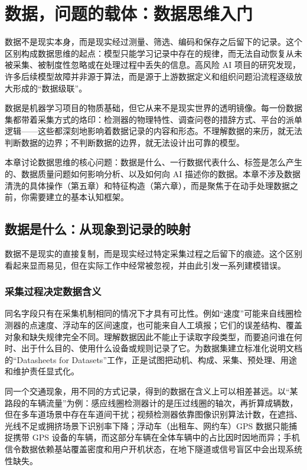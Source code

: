 ﻿\chapter{数据，问题的载体：数据思维入门}

数据不是现实本身，而是现实经过测量、筛选、编码和保存之后留下的记录。这个区别构成数据思维的起点：模型只能学习记录中存在的规律，而无法自动恢复从未被采集、被制度性忽略或在处理过程中丢失的信息。高风险 AI 项目的研究发现，许多后续模型故障并非源于算法，而是源于上游数据定义和组织问题沿流程逐级放大形成的“数据级联”\cite{sambasivan2021data}。

数据是机器学习项目的物质基础，但它从来不是现实世界的透明镜像。每一份数据集都带着采集方式的烙印：检测器的物理特性、调查问卷的措辞方式、平台的派单逻辑——这些都深刻地影响着数据记录的内容和形态。不理解数据的来历，就无法判断数据的边界；不判断数据的边界，就无法设计出可靠的模型。

本章讨论数据思维的核心问题：数据是什么、一行数据代表什么、标签是怎么产生的、数据质量问题如何影响分析、以及如何向 AI 描述你的数据。本章不涉及数据清洗的具体操作（第五章）和特征构造（第六章），而是聚焦于在动手处理数据之前，你需要建立的基本认知框架。

\section{数据是什么：从现象到记录的映射}

数据不是现实的直接复制，而是现实经过特定采集过程之后留下的痕迹。这个区别看起来显而易见，但在实际工作中经常被忽视，并由此引发一系列建模错误。

\subsection{采集过程决定数据含义}

同名字段只有在采集机制相同的情况下才具有可比性。例如“速度”可能来自线圈检测器的点速度、浮动车的区间速度，也可能来自人工填报；它们的误差结构、覆盖对象和缺失规律完全不同。理解数据因此不能止于读取字段类型，而要追问谁在何时、出于什么目的、使用什么设备或规则记录了它。为数据集建立标准化说明文档的“Datasheets for Datasets”工作，正是试图把动机、构成、采集、预处理、用途和维护责任显式化\cite{gebru2021datasheets}。

同一个交通现象，用不同的方式记录，得到的数据在含义上可以相差甚远。以“某路段的车辆流量”为例：感应线圈检测器计的是压过线圈的轴次，再折算成辆数，但在多车道场景中存在车道间干扰；视频检测器依靠图像识别算法计数，在遮挡、光线不足或拥挤场景下识别率下降；浮动车（出租车、网约车）GPS 数据只能捕捉携带 GPS 设备的车辆，而这部分车辆在全体车辆中的占比因时因地而异；手机信令数据依赖基站覆盖密度和用户开机状态，在地下隧道或信号盲区中会出现系统性缺失。

